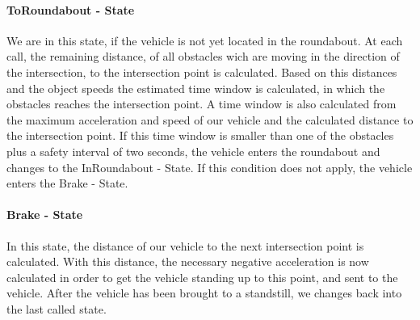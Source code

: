 \documentclass[11pt,oneside,openright]{mpreport}
\begin{document}
\paragraph{ToRoundabout - State}
We are in this state, if the vehicle is not yet located in the roundabout. At each call, the remaining distance,
of all obstacles wich are moving in the direction of the intersection, to the intersection point is calculated. 
Based on this distances and the object speeds the estimated time window is calculated, in which the obstacles reaches the intersection point.
A time window is also calculated from the maximum acceleration and speed of our vehicle and the calculated distance to the intersection point.
If this time window is smaller than one of the obstacles plus a safety interval of two seconds, the vehicle enters the roundabout and changes to the InRoundabout - State.
If this condition does not apply, the vehicle enters the Brake - State.
\paragraph{Brake - State}
In this state, the distance of our vehicle to the next intersection point is calculated.
With this distance, the necessary negative acceleration is now calculated in order to get the vehicle standing up to this point,
and sent to the vehicle. After the vehicle has been brought to a standstill, we changes back into the last called state.
\end{document}
